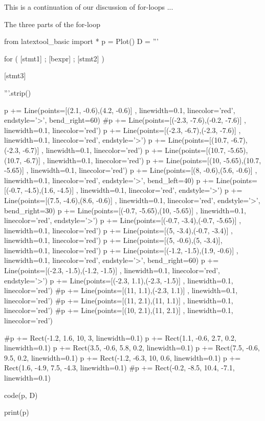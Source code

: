 \newpage{}

This is a continuation of our discussion of for-loops ...

The three parts of the for-loop
\begin{python}
from latextool_basic import *
p = Plot()
D = '''





for ( [stmt1] ;     [bexpr]  ;        [stmt2] )









         
               [stmt3]






'''.strip()

p += Line(points=[(2.1, -0.6),(4.2, -0.6)] , linewidth=0.1, linecolor='red', endstyle='>', bend_right=60)
#p += Line(points=[(-2.3, -7.6),(-0.2, -7.6)] , linewidth=0.1, linecolor='red')
p += Line(points=[(-2.3, -6.7),(-2.3, -7.6)] , linewidth=0.1, linecolor='red', endstyle='>')
p += Line(points=[(10.7, -6.7),(-2.3, -6.7)] , linewidth=0.1, linecolor='red')
p += Line(points=[(10.7, -5.65), (10.7, -6.7)] , linewidth=0.1, linecolor='red')
p += Line(points=[(10, -5.65),(10.7, -5.65)] , linewidth=0.1, linecolor='red')
p += Line(points=[(8, -0.6),(5.6, -0.6)] , linewidth=0.1, linecolor='red', endstyle='>', bend_left=40)
p += Line(points=[(-0.7, -4.5),(1.6, -4.5)] , linewidth=0.1, linecolor='red', endstyle='>')
p += Line(points=[(7.5, -4.6),(8.6, -0.6)] , linewidth=0.1, linecolor='red', endstyle='>', bend_right=30)
p += Line(points=[(-0.7, -5.65),(10, -5.65)] , linewidth=0.1, linecolor='red', endstyle='>')
p += Line(points=[(-0.7, -3.4),(-0.7, -5.65)] , linewidth=0.1, linecolor='red')
p += Line(points=[(5, -3.4),(-0.7, -3.4)] , linewidth=0.1, linecolor='red')
p += Line(points=[(5, -0.6),(5, -3.4)], linewidth=0.1, linecolor='red')
p += Line(points=[(-1.2, -1.5),(1.9, -0.6)] , linewidth=0.1, linecolor='red', endstyle='>', bend_right=60)
p += Line(points=[(-2.3, -1.5),(-1.2, -1.5)] , linewidth=0.1, linecolor='red', endstyle='>')
p += Line(points=[(-2.3, 1.1),(-2.3, -1.5)] , linewidth=0.1, linecolor='red')
#p += Line(points=[(11, 1.1),(-2.3, 1.1)] , linewidth=0.1, linecolor='red')
#p += Line(points=[(11, 2.1),(11, 1.1)] , linewidth=0.1, linecolor='red')
#p += Line(points=[(10, 2.1),(11, 2.1)] , linewidth=0.1, linecolor='red')

#p += Rect(-1.2, 1.6, 10, 3, linewidth=0.1)
p += Rect(1.1, -0.6, 2.7, 0.2, linewidth=0.1)
p += Rect(3.5, -0.6, 5.8, 0.2, linewidth=0.1)
p += Rect(7.5, -0.6, 9.5, 0.2, linewidth=0.1)
p += Rect(-1.2, -6.3, 10, 0.6, linewidth=0.1)
p += Rect(1.6, -4.9, 7.5, -4.3, linewidth=0.1)
#p += Rect(-0.2, -8.5, 10.4, -7.1, linewidth=0.1)

code(p, D)

print(p)
\end{python}

